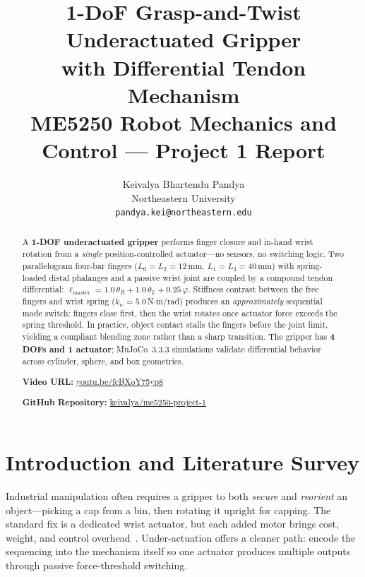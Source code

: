 \documentclass[10pt,twocolumn]{article}
\title{%
  \large\textbf{1-DoF Grasp-and-Twist Underactuated Gripper\\[2pt]
  with Differential Tendon Mechanism}\\[5pt]
  \normalsize ME5250 Robot Mechanics and Control --- Project 1 Report%
}
\author{%
  \normalsize Keivalya Bhartendu Pandya \\
  \small Northeastern University \\
  \small \texttt{pandya.kei@northeastern.edu}
}
\date{}
\begin{document}
\maketitle
\thispagestyle{empty}

\begin{abstract}
\noindent
A \textbf{1-DOF underactuated gripper} performs finger closure and in-hand wrist rotation from a \emph{single} position-controlled actuator---no sensors, no switching logic. Two parallelogram four-bar fingers ($L_0=L_2=12$\,mm, $L_1=L_3=40$\,mm) with spring-loaded distal phalanges and a passive wrist joint are coupled by a compound tendon differential: $\ell_\text{master} = 1.0\,\theta_R + 1.0\,\theta_L + 0.25\,\varphi$. Stiffness contrast between the free fingers and wrist spring ($k_w=5.0$\,N$\cdot$m/rad) produces an \emph{approximately} sequential mode switch: fingers close first, then the wrist rotates once actuator force exceeds the spring threshold. In practice, object contact stalls the fingers before the joint limit, yielding a compliant blending zone rather than a sharp transition. The gripper has \textbf{4 DOFs and 1 actuator}; MuJoCo~3.3.3 simulations validate differential behavior across cylinder, sphere, and box geometries.

\noindent
\textbf{Video URL:} \href{https://youtu.be/fcBXoY75yp8}{youtu.be/fcBXoY75yp8}

\noindent
\textbf{GitHub Repository:} \href{https://github.com/keivalya/me5250-project-1}{keivalya/me5250-project-1}
\end{abstract}

\section{Introduction and Literature Survey}
\label{sec:intro}

Industrial manipulation often requires a gripper to both \emph{secure} and \emph{reorient} an object---picking a cap from a bin, then rotating it upright for capping. The standard fix is a dedicated wrist actuator, but each added motor brings cost, weight, and control overhead~\cite{birglen2008}. Under-actuation offers a cleaner path: encode the sequencing into the mechanism itself so one actuator produces multiple outputs through passive force-threshold switching.
\end{document}
